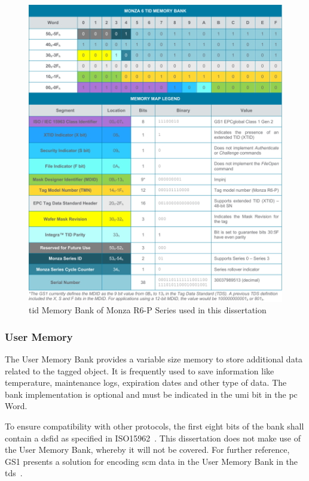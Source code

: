 \begin{figure}
    \centering
    \includegraphics[width=\textwidth]{./figs/02-state-of-the-art/tid.pdf}
    \caption[\ac{tid} Memory Bank of Monza R6-P Series used in this dissertation]{\ac{tid} Memory Bank of Monza R6-P Series used in this dissertation~\cite{TIDMemoryMaps}} 
    \label{fig:tid}
\end{figure}

\subsubsection{User Memory}

The User Memory Bank provides a variable size memory to store additional data related to the tagged object.
It is frequently used to save information like temperature, maintenance logs, expiration dates and other type of data.
The bank implementation is optional and must be indicated in the \ac{umi} bit in the \ac{pc} Word.

To ensure compatibility with other protocols, the first eight bits of the bank shall contain a \ac{dsfid} as specified in ISO15962~\cite{isoISOIEC15962}.
This dissertation does not make use of the User Memory Bank, whereby it will not be covered.
For further reference, GS1 presents a solution for encoding \ac{scm} data in the User Memory Bank in the \ac{tds}~\cite{EPCTagData}.

